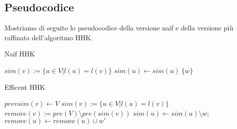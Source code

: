 \subsection{Pseudocodice}
Mostriamo di seguito lo pseudocodice della versione naif e della versione più raffinata dell'algoritmo HHK.
\begin{algorithm}
\caption{Naif HHK}
\begin{algorithmic}[1]
    $sim(v) := \{u \in V|l(u)=l(v)\}$  
\EndFor
{}
\State $sim(u)\gets sim(u) \ \{w\}$
\EndWhile
\end{algorithmic}
\end{algorithm}

\begin{algorithm}
\caption{Efficent HHK}
\begin{algorithmic}[1]
  \State $prevsim(v) \gets V$
    $sim(v) := \{u \in V|l(u)=l(v)\}$  
  \EndIf
  \State$remove(v):=pre(V)\setminus pre(sim(v))$
\EndFor
{}
        $sim(u)\gets sim(u)\setminus {w};$
            $remove(u)\gets remove(u)\cup{w'}$
          \EndIf
        \EndFor
      \EndIf
    \EndFor  
  \EndFor
\EndWhile
\end{algorithmic}
\end{algorithm}
